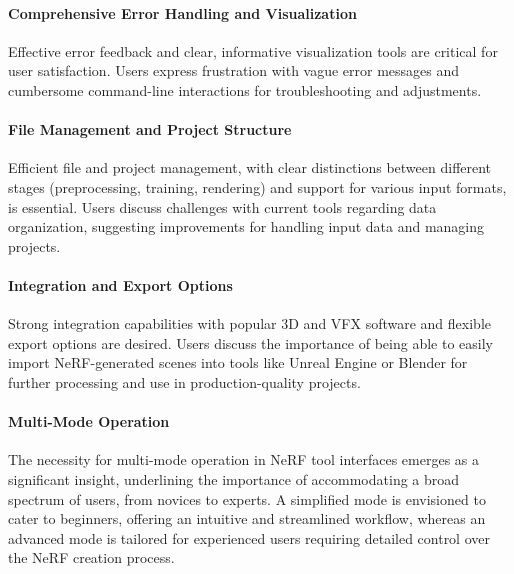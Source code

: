
\paragraph{Comprehensive Error Handling and Visualization}
Effective error feedback and clear, informative visualization tools are critical for user satisfaction. 
Users express frustration with vague error messages and cumbersome command-line interactions for troubleshooting and adjustments. 
\cite{P2, P3}


\paragraph{File Management and Project Structure}
Efficient file and project management, with clear distinctions between different stages (preprocessing, training, rendering) and support for various input formats, is essential. 
Users discuss challenges with current tools regarding data organization, suggesting improvements for handling input data and managing projects​​.
\cite{P1, P3}

\paragraph{Integration and Export Options}
Strong integration capabilities with popular 3D and VFX software and flexible export options are desired. 
Users discuss the importance of being able to easily import NeRF-generated scenes into tools like Unreal Engine \cite{noauthor_unreal_nodate} or Blender \cite{noauthor_blender_nodate} for further processing and use in production-quality projects​​.
\cite{P1, P2, P4}

\paragraph{Multi-Mode Operation}
The necessity for multi-mode operation in NeRF tool interfaces emerges as a significant insight, underlining the importance of accommodating a broad spectrum of users, from novices to experts. 
A simplified mode is envisioned to cater to beginners, offering an intuitive and streamlined workflow, whereas an advanced mode is tailored for experienced users requiring detailed control over the NeRF creation process. 
\cite{P1, P2, P3, P4}


